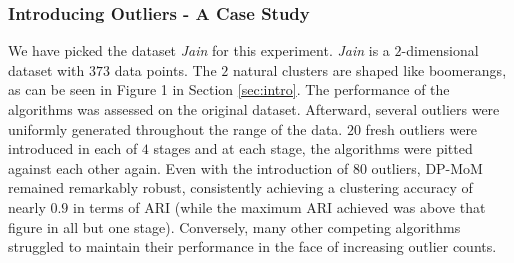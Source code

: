 \documentclass{article}
\begin{document}
\subsubsection{Introducing Outliers - A Case Study}

We have picked the dataset \textit{Jain} \citep{jain-dataset} for this experiment. \textit{Jain} is a $2$-dimensional dataset with $373$ data points. The $2$ natural clusters are shaped like boomerangs, as can be seen in Figure 1 in Section \ref{sec:intro}. The performance of the algorithms was assessed on the original dataset. Afterward, several outliers were uniformly generated throughout the range of the data. $20$ fresh outliers were introduced in each of $4$ stages and at each stage, the algorithms were pitted against each other again. Even with the introduction of $80$ outliers, DP-MoM remained remarkably robust, consistently achieving a clustering accuracy of nearly $0.9$ in terms of ARI  (while the maximum ARI achieved was above that figure in all but one stage). Conversely, many other competing algorithms struggled to maintain their performance in the face of increasing outlier counts. 

\end{document}
